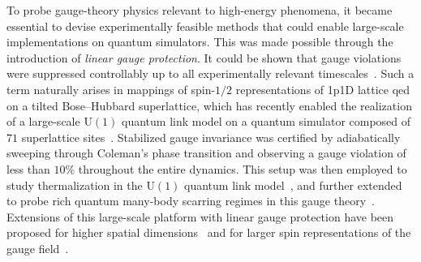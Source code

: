 To probe gauge-theory physics relevant to high-energy phenomena, it became essential to devise experimentally feasible methods that could enable large-scale implementations on quantum simulators. This was made possible through the introduction of \textit{linear gauge protection}. It could be shown that gauge violations were suppressed controllably up to all experimentally relevant timescales~\cite{Halimeh2021}. Such a term naturally arises in mappings of spin-$1/2$ representations of \gls{1p1D} lattice \gls{qed} on a tilted Bose--Hubbard superlattice, which has recently enabled the realization of a large-scale $\mathrm{U}(1)$ quantum link model on a quantum simulator composed of $71$ superlattice sites~\cite{Yang2020}. Stabilized gauge invariance was certified by adiabatically sweeping through Coleman's phase transition and observing a gauge violation of less than $10\%$ throughout the entire dynamics. This setup was then employed to study thermalization in the $\mathrm{U}(1)$ quantum link model~\cite{Zhou2022,Wang2022}, and further extended to probe rich quantum many-body scarring regimes in this gauge theory~\cite{Su2023}. Extensions of this large-scale platform with linear gauge protection have been proposed for higher spatial dimensions~\cite{Osborne2022} and for larger spin representations of the gauge field~\cite{osborne2023spins}.

